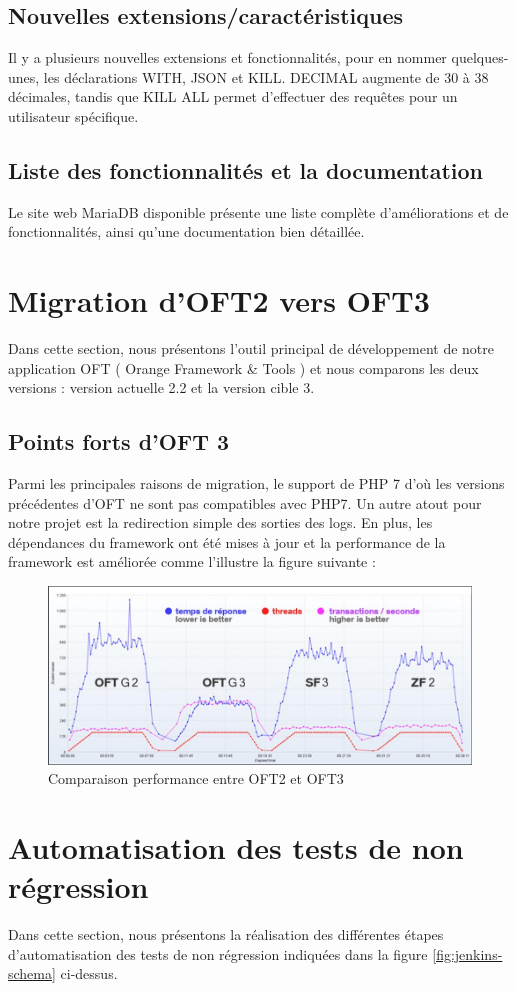 \subsection{Nouvelles extensions/caractéristiques}
Il y a plusieurs nouvelles extensions et fonctionnalités, pour en nommer quelques-unes, les déclarations WITH, JSON et KILL. DECIMAL augmente de 30 à 38 décimales, tandis que KILL ALL permet d'effectuer des requêtes pour un utilisateur spécifique.
\subsection{Liste des fonctionnalités et la documentation}
Le site web MariaDB disponible présente une liste complète d'améliorations et de fonctionnalités, ainsi qu’une documentation bien détaillée.
\section{Migration d’OFT2 vers OFT3}
Dans cette section, nous présentons l’outil principal de développement de notre application OFT ( Orange Framework \& Tools ) et nous comparons les deux versions : version actuelle 2.2 et la version cible 3.
\subsection{Points forts d’OFT 3}
Parmi les principales raisons de migration, le support de PHP 7 d’où les versions précédentes  d’OFT ne sont pas compatibles avec PHP7. Un autre atout pour notre projet est la redirection simple des sorties des logs. En plus, les dépendances du framework ont été mises à jour et la performance de la framework est améliorée comme l'illustre la figure suivante :
\begin{figure}[H]
	\centering
	\includegraphics[width=0.7\linewidth]{img/oft-3}
	\caption[Comparaison performance entre OFT2 et OFT3]{Comparaison performance entre OFT2 et OFT3}
	\label{fig:oft-3}
\end{figure}
\section[Automatisation des tests de non régression]{Automatisation des tests de non régression}
Dans cette section, nous présentons la réalisation des différentes étapes d’automatisation des tests de non régression indiquées dans la figure \ref{fig:jenkins-schema} ci-dessus.
